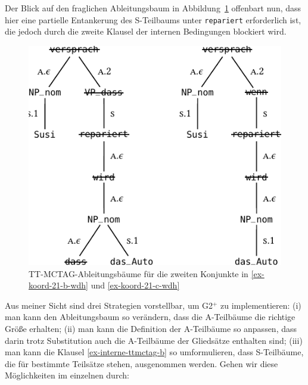 Der Blick auf den fraglichen Ableitungsbaum in Abbildung~\ref{fig-deanchoring-11-2} offenbart nun, dass hier eine partielle Entankerung des S-Teilbaums unter {\tt repariert} erforderlich ist, die jedoch durch die zweite Klausel der internen Bedingungen blockiert wird. 
\begin{figure}[t]
\centering
\includegraphics{graphics/abb828.pdf}
\caption{\label{fig-deanchoring-11-2}TT-MCTAG-Ableitungsbäume für die zweiten Konjunkte in \ref{ex-koord-21-b-wdh} und \ref{ex-koord-21-c-wdh}}
\end{figure}
Aus meiner Sicht sind drei Strategien vorstellbar, um G2$^+$  zu implementieren: (i) man kann den Ableitungsbaum so verändern, dass die A-Teilbäume die richtige Grö\ss e erhalten; (ii) man kann die Definition der A-Teilbäume so anpassen, dass darin trotz Substitution auch die A-Teilbäume der Gliedsätze enthalten sind; (iii) man kann die Klausel \ref{ex-interne-ttmctag-b} so umformulieren, dass S-Teilbäume, die für bestimmte Teilsätze stehen, ausgenommen werden. Gehen wir diese Möglichkeiten im einzelnen durch:


